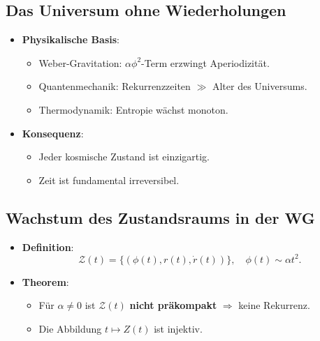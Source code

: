 \subsection{Das Universum ohne Wiederholungen}
\begin{itemize}
\item \textbf{Physikalische Basis}:
  \begin{itemize}
  \item Weber-Gravitation: $\alpha \phi^2$-Term erzwingt Aperiodizität.
  \item Quantenmechanik: Rekurrenzzeiten $\gg$ Alter des Universums.
  \item Thermodynamik: Entropie wächst monoton.
  \end{itemize}
\item \textbf{Konsequenz}: 
  \begin{itemize}
  \item Jeder kosmische Zustand ist einzigartig.
  \item Zeit ist fundamental irreversibel.
  \end{itemize}
\end{itemize}

\subsection{Wachstum des Zustandsraums in der WG}
\begin{itemize}
\item \textbf{Definition}: 
  \begin{equation}
  \mathcal{Z}(t) = \{ (\phi(t), r(t), \dot{r}(t)) \}, \quad \phi(t) \sim \alpha t^2.
  \end{equation}
\item \textbf{Theorem}: 
  \begin{itemize}
  \item Für $\alpha \neq 0$ ist $\mathcal{Z}(t)$ \textbf{nicht präkompakt} $\Rightarrow$ keine Rekurrenz.
  \item Die Abbildung $t \mapsto Z(t)$ ist injektiv.
  \end{itemize}
\end{itemize}
